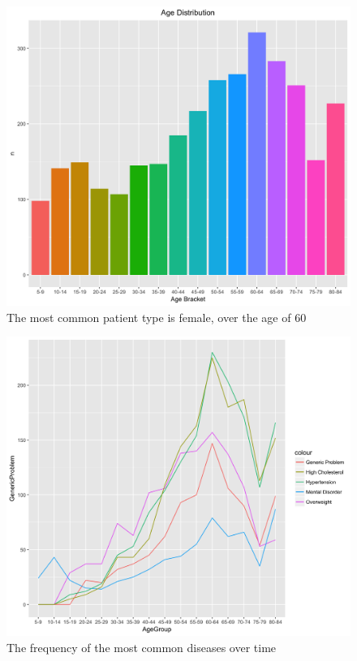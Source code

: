 \documentclass[runningheads]{llncs}
\begin{document}
\begin{figure}[H]
\includegraphics[width=\textwidth,keepaspectratio]{figs/image7.png}
\caption{The most common patient type is female, over the age of 60}
\label{fig:age}
\centering
\end{figure}

\begin{figure}[H]
\includegraphics[width=\textwidth,keepaspectratio]{figs/image10.png}
\caption{The frequency of the most common diseases over time}
\label{fig:age_disease}
\centering
\end{figure}
\end{document}
